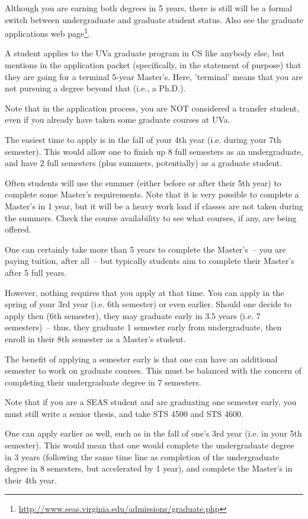\documentclass[10pt,letter,twocolumn]{book}
\newcommand{\myurl}[1]{\footnote{\scriptsize\url{#1}}}
\begin{document}
Although you are earning both degrees in 5 years, there is still will
be a formal switch between undergraduate and graduate student status.
Also see the graduate applications web
page\myurl{http://www.seas.virginia.edu/admissions/graduate.php}.

A student applies to the UVa graduate program in CS like anybody else,
but mentions in the application packet (specifically, in the statement
of purpose) that they are going for a terminal 5-year Master's.  Here,
'terminal' means that you are not pursuing a degree beyond that (i.e.,
a Ph.D.).

Note that in the application process, you are NOT considered a
transfer student, even if you already have taken some graduate courses
at UVa.

The easiest time to apply is in the fall of your 4th year (i.e. during
your 7th semester).  This would allow one to finish up 8 full
semesters as an undergraduate, and have 2 full semesters (plus
summers, potentially) as a graduate student.

Often students will use the summer (either before or after their 5th
year) to complete some Master's requirements.  Note that it is very
possible to complete a Master's in 1 year, but it will be a heavy work
load if classes are not taken during the summers.  Check the course
availability to see what courses, if any, are being offered.

One can certainly take more than 5 years to complete the Master's~--
you are paying tuition, after all~-- but typically students aim to
complete their Master's after 5 full years.

However, nothing requires that you apply at that time.  You can apply
in the spring of your 3rd year (i.e. 6th semester) or even earlier.
Should one decide to apply then (6th semester), they may graduate
early in 3.5 years (i.e. 7 semesters)~-- thus, they graduate 1
semester early from undergraduate, then enroll in their 8th semester
as a Master's student.

The benefit of applying a semester early is that one can have an
additional semester to work on graduate courses.  This must be
balanced with the concern of completing their undergraduate degree in
7 semesters.

Note that if you are a SEAS student and are graduating one semester
early, you must still write a senior thesis, and take STS 4500 and STS
4600.

One can apply earlier as well, such as in the fall of one's 3rd year
(i.e. in your 5th semester).  This would mean that one would complete
the undergraduate degree in 3 years (following the same time line as
completion of the undergraduate degree in 8 semesters, but accelerated
by 1 year), and complete the Master's in their 4th year.
\end{document}
